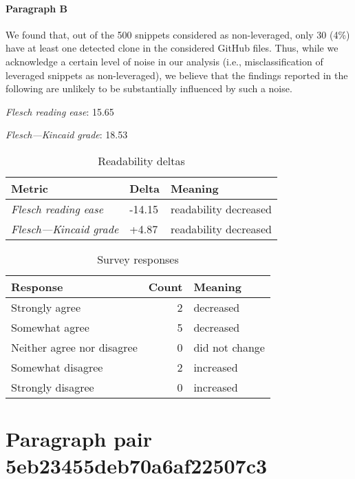 \paragraph{Paragraph B}
We found that, out of the 500 snippets considered as non-leveraged, only 30 (4\%) have at least one detected clone in the considered GitHub files. Thus, while we acknowledge a certain level of noise in our analysis (i.e., misclassification of leveraged snippets as non-leveraged), we believe that the findings reported in the following are unlikely to be substantially influenced by such a noise.\par\medskip
\emph{Flesch reading ease}: 15.65\par
\emph{Flesch---Kincaid grade}: 18.53

\bigskip\begin{table}[!h]
\centering
\begin{tabular}{lll}
\toprule
               \textbf{Metric} & \textbf{Delta} &       \textbf{Meaning} \\
\midrule
    \emph{Flesch reading ease} &         -14.15 &  readability decreased \\
 \emph{Flesch---Kincaid grade} &          +4.87 &  readability decreased \\
\bottomrule
\end{tabular}
\caption*{Readability deltas}\end{table}

\begin{table}[!h]
\centering
\begin{tabular}{lrl}
\toprule
          \textbf{Response} &  \textbf{Count} & \textbf{Meaning} \\
\midrule
             Strongly agree &               2 &        decreased \\
             Somewhat agree &               5 &        decreased \\
 Neither agree nor disagree &               0 &   did not change \\
          Somewhat disagree &               2 &        increased \\
          Strongly disagree &               0 &        increased \\
\bottomrule
\end{tabular}
\caption*{Survey responses}\end{table}


\newpage
\section{Paragraph pair 5eb23455deb70a6af22507c3}
